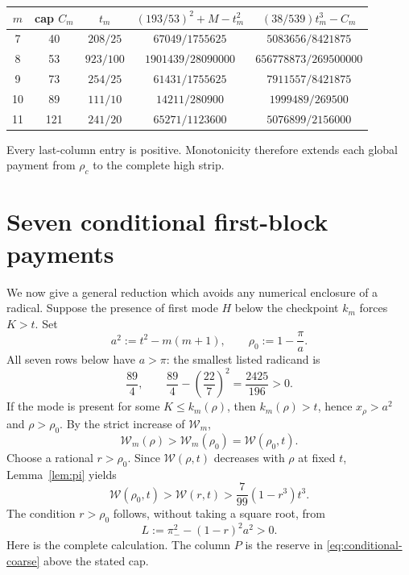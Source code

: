 \documentclass[11pt]{article}
\newcommand{\W}{\mathcal W}
\newcommand{\pimin}{\pi_-}
\begin{document}
\begin{center}
\small
\renewcommand{\arraystretch}{1.18}
\begin{tabular}{@{}c c c c c@{}}
\toprule
\(m\)&cap \(C_m\)&\(t_m\)&
\((193/53)^2+M-t_m^2\)&\((38/539)t_m^3-C_m\)\\
\midrule
7&40&\(208/25\)&\(67049/1755625\)&\(5083656/8421875\)\\
8&53&\(923/100\)&\(1901439/28090000\)&\(656778873/269500000\)\\
9&73&\(254/25\)&\(61431/1755625\)&\(7911557/8421875\)\\
10&89&\(111/10\)&\(14211/280900\)&\(1999489/269500\)\\
11&121&\(241/20\)&\(65271/1123600\)&\(5076899/2156000\)\\
\bottomrule
\end{tabular}
\end{center}
Every last-column entry is positive.  Monotonicity therefore extends each
global payment from \(\rho_c\) to the complete high strip.

\section{Seven conditional first-block payments}

We now give a general reduction which avoids any numerical enclosure of a
radical.  Suppose the presence of first mode \(H\) below the checkpoint
\(k_m\) forces \(K>t\).  Set
\begin{equation}
 a^2:=t^2-m(m+1),\qquad
 \rho_0:=1-\frac{\pi}{a}.
 \label{eq:conditional-rho0}
\end{equation}
All seven rows below have \(a>\pi\): the smallest listed radicand is
\[
 \frac{89}{4},\qquad
 \frac{89}{4}-\left(\frac{22}{7}\right)^2
 =\frac{2425}{196}>0.
\]
If the mode is present for some
\(K\leq k_m(\rho)\), then \(k_m(\rho)>t\), hence
\(x_\rho>a^2\) and \(\rho>\rho_0\).  By the strict increase of
\(\W_m\),
\[
 \W_m(\rho)>\W_m(\rho_0)=\W(\rho_0,t).
\]
Choose a rational \(r>\rho_0\).  Since \(\W(\rho,t)\) decreases with
\(\rho\) at fixed \(t\), Lemma~\ref{lem:pi} yields
\begin{equation}
 \W(\rho_0,t)>\W(r,t)>
 \frac7{99}(1-r^3)t^3.
 \label{eq:conditional-coarse}
\end{equation}
The condition \(r>\rho_0\) follows, without taking a square root, from
\begin{equation}
 L:=\pimin^2-(1-r)^2a^2>0.
 \label{eq:location-witness}
\end{equation}
Here is the complete calculation.  The column \(P\) is the reserve in
\eqref{eq:conditional-coarse} above the stated cap.
\end{document}
